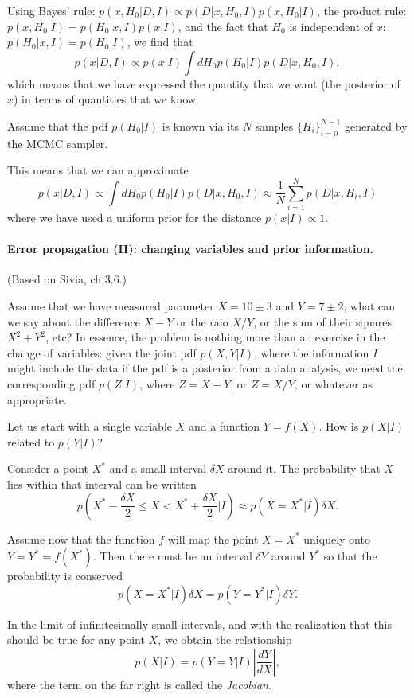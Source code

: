 \documentclass[%
oneside,                 %
final,                   %
10pt]{article}
\begin{document}
Using Bayes' rule: $p(x,H_0|D,I) \propto p(D|x,H_0,I) p(x,H_0|I)$, the product rule: $p(x,H_0|I) = p(H_0|x,I)p(x|I)$, and the fact that $H_0$ is independent of $x$: $p(H_0|x,I) = p(H_0|I)$, we find that
\[
p(x|D,I) \propto p(x|I) \int dH_0 p(H_0|I) p(D|x,H_0,I),
\]
which means that we have expressed the quantity that we want (the posterior of $x$) in terms of quantities that we know.

Assume that the pdf $p(H_0 | I)$ is known via its $N$ samples $\{H_{i}\}_{i=0}^{N-1}$ generated by the MCMC sampler.

This means that we can approximate 
\[
p(x |D,I) \propto \int dH_0 p(H_0|I) p(D|x,H_0,I) \approx \frac{1}{N} \sum_{i=1}^N p(D | x, H_i, I)
\]
where we have used a uniform prior for the distance $p(x|I) \propto 1$.


\paragraph{Error propagation (II): changing variables and prior information.}
(Based on Sivia, ch 3.6.)

Assume that we have measured parameter $X = 10 \pm 3$ and $Y=7 \pm 2$; what can we say about the difference $X-Y$ or the raio $X/Y$, or the sum of their squares $X^2+Y^2$, etc? In essence, the problem is nothing more than an exercise in the change of variables: given the joint pdf $p(X,Y|I)$, where the information $I$ might include the data if the pdf is a posterior from a data analysis, we need the corresponding pdf $p(Z|I)$, where $Z=X-Y$, or $Z=X/Y$, or whatever as appropriate.

Let us start with a single variable $X$ and a function $Y=f(X)$. How is $p(X|I)$ related to $p(Y|I)$?

Consider a point $X^*$ and a small interval $\delta X$ around it. The probability that $X$ lies within that interval can be written
\[
p \left( X^* - \frac{\delta X}{2} \le X < X^* + \frac{\delta X}{2} \big| I \right) 
\approx p(X=X^*|I) \delta X.
\]

Assume now that the function $f$ will map the point $X=X^*$ uniquely onto $Y=Y^*=f(X^*)$. Then there must be an interval $\delta Y$ around $Y^*$ so that the probability is conserved
\[
p(X=X^*|I) \delta X = p(Y=Y^*|I) \delta Y.
\]

In the limit of infinitesimally small intervals, and with the realization that this should be true for any point $X$, we obtain the relationship
\begin{equation}
p(X|I) = p(Y=Y|I) \left| \frac{dY}{dX} \right|,
\label{eq:transformation}
\end{equation}
where the term on the far right is called the \emph{Jacobian}.
\end{document}
